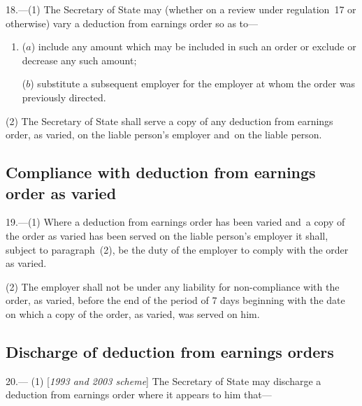 \documentclass[12pt,a4paper]{article}
\begin{document}
18.—(1) The Secretary of State may (whether on a review under regulation~17 or otherwise) vary a deduction from earnings order so as to—
\begin{enumerate}\item[]
($a$) include any amount which may be included in such an order or exclude or decrease any such amount;

($b$) substitute a subsequent employer for the employer at whom the order was previously directed.
\end{enumerate}

(2) The Secretary of State shall serve a copy of any deduction from earnings order, as varied, on the liable person’s employer and~on the liable person.

\subsection[19. Compliance with deduction from earnings order as varied]{Compliance with deduction from earnings order as varied}

19.—(1) Where a deduction from earnings order has been varied and~a copy of the order as varied has been served on the liable person’s employer it shall, subject to paragraph~(2), be the duty of the employer to comply with the order as varied.

(2) The employer shall not be under any liability for non-compliance with the order, as varied, before the end of the period of 7 days beginning with the date on which a copy of the order, as varied, was served on him.

\subsection[20. Discharge of deduction from earnings orders]{Discharge of deduction from earnings orders}

20.—%
%
%
(1) [\emph{1993 and 2003 scheme}] The Secretary of State may discharge a deduction from earnings order where it appears to him that—
\end{document}
